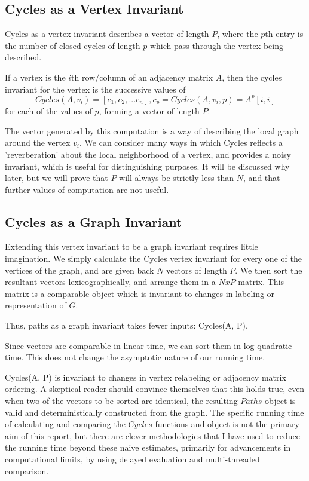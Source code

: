 \documentclass[11pt,a4paper]{report}
\begin{document}
\subsection{Cycles as a Vertex Invariant}

Cycles as a vertex invariant describes a vector of length $P$, where the $p$th entry is the number of closed cycles of length $p$ which pass through the vertex being described.

If a vertex is the $i$th row/column of an adjacency matrix $A$, then the cycles invariant for the vertex is the successive values of 
$$Cycles(A, v_i) = [c_1, c_2, ... c_n] , c_p = Cycles(A, v_i, p) = A^p[i,i]$$
for each of the values of $p$, forming a vector of length $P$.

The vector generated by this computation is a way of describing the local graph around the vertex $v_i$.
We can consider many ways in which Cycles reflects a 'reverberation' about the local neighborhood of a vertex, and provides a noisy invariant, which is useful for distinguishing purposes. 
It will be discussed why later, but we will prove that $P$ will always be strictly less than $N$, and that further values of computation are not useful.

\subsection{Cycles as a Graph Invariant}

Extending this vertex invariant to be a graph invariant requires little imagination. 
We simply calculate the Cycles vertex invariant for every one of the vertices of the graph, and are given back $N$ vectors of length $P$.
We then sort the resultant vectors lexicographically, and arrange them in a $NxP$ matrix.
This matrix is a comparable object which is invariant to changes in labeling or representation of $G$.

Thus, paths as a graph invariant takes fewer inputs: Cycles(A, P).

Since vectors are comparable in linear time, we can sort them in log-quadratic time.
This does not change the asymptotic nature of our running time.

Cycles(A, P) is invariant to changes in vertex relabeling or adjacency matrix ordering.
A skeptical reader should convince themselves that this holds true, even when two of the vectors to be sorted are identical, the resulting $Paths$ object is valid and deterministically constructed from the graph.
The specific running time of calculating and comparing the $Cycles$ functions and object is not the primary aim of this report, but there are clever methodologies that I have used to reduce the running time beyond these naive estimates, primarily for advancements in computational limits, by using delayed evaluation and multi-threaded comparison.
\end{document}

